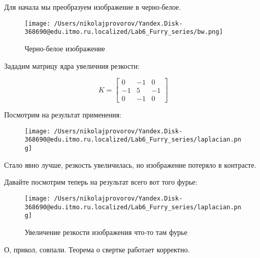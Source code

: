 Для начала мы преобразуем изображение в черно-белое.

\begin{figure}[ht!]
    \centering
    \texttt{[image: /Users/nikolajprovorov/Yandex.Disk-368690@edu.itmo.ru.localized/Lab6\_Furry\_series/bw.png]}
    \caption{Черно-белое изображение}
\end{figure}

Зададим матрицу ядра увеличния резкости:

\begin{equation}
    K = 
    \begin{bmatrix}
        0 & -1 & 0 \\
        -1 & 5 & -1 \\
        0 & -1 & 0
    \end{bmatrix}
\end{equation}

Посмотрим на результат применения:

\clearpage

\begin{figure}[ht!]
    \centering
    \texttt{[image: /Users/nikolajprovorov/Yandex.Disk-368690@edu.itmo.ru.localized/Lab6\_Furry\_series/laplacian.png]}
\end{figure}

Стало явно лучше, резкость увеличилась, но изображение потеряло в контрасте.

Давайте посмотрим теперь на результат всего вот того фурье:

\begin{figure}[ht!]
    \centering
    \texttt{[image: /Users/nikolajprovorov/Yandex.Disk-368690@edu.itmo.ru.localized/Lab6\_Furry\_series/laplacian.png]}
    \caption{Увеличение резкости изображения что-то там фурье}
\end{figure}

О, прикол, совпали. Теорема о свертке работает корректно.